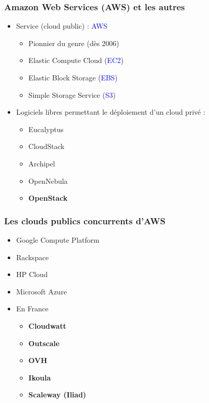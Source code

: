   \begin{frame}
    \frametitle{Amazon Web Services (AWS) et les autres}
    \begin{itemize}
      \item Service (cloud public) : \textcolor{blue}{AWS}
      \begin{itemize}
        \item Pionnier du genre (dès 2006)\pause
        \item Elastic Compute Cloud (\textcolor{blue}{EC2})
        \item Elastic Block Storage (\textcolor{blue}{EBS})\pause
        \item Simple Storage Service (\textcolor{blue}{S3})\pause
      \end{itemize}
        \item Logiciels libres permettant le déploiement d'un cloud privé :
      \begin{itemize}
        \item Eucalyptus
        \item CloudStack
        \item Archipel
        \item OpenNebula\pause
        \item \textbf{OpenStack}
      \end{itemize}
    \end{itemize}
  \end{frame}

  \begin{frame}
    \frametitle{Les clouds publics concurrents d'AWS}
    \begin{itemize}
      \item Google Compute Platform
      \item Rackspace
      \item HP Cloud
      \item Microsoft Azure
      \item En France
      \begin{itemize}
        \item \textbf{Cloudwatt}
        \item \textbf{Outscale}
        \item \textbf{OVH}
        \item \textbf{Ikoula}
        \item \textbf{Scaleway (Iliad)}
      \end{itemize}
    \end{itemize}
  \end{frame}

